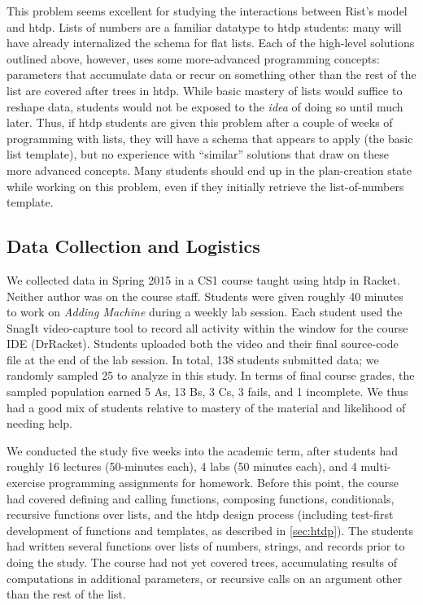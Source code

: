 \documentclass{sig-alternate-05-2015}
\newcommand{\htdp}{{\sc htdp}\xspace}
\def\problemName#1{\emph{#1}\xspace}
\def\Adding{\problemName{Adding Machine}}
\begin{document}
This problem seems excellent for studying the interactions between Rist's model and \htdp.  Lists of numbers are a familiar datatype to \htdp students: many will have already internalized the schema for flat lists.  Each of the high-level solutions outlined above, however, uses some more-advanced programming concepts: parameters that accumulate data or recur on something other than the rest of the list are covered after trees in \htdp. While basic mastery of lists would suffice to reshape data, students would not be exposed to the \emph{idea} of doing so until much later.  Thus, if \htdp students are given this problem after a couple of weeks of programming with lists, they will have a schema that appears to apply (the basic list template), but no experience with ``similar'' solutions that draw on these more advanced concepts.  Many students should end up in the plan-creation state while working on this problem, even if they initially retrieve the list-of-numbers template.

\subsection{Data Collection and Logistics}
\label{sec:logistics}
We collected data in Spring 2015 in a CS1 course taught using \htdp in Racket.  Neither author was on the course staff.  Students were given roughly 40 minutes to work on \Adding during a weekly lab session.  Each student used the SnagIt video-capture tool to record all activity within the window for the course IDE (DrRacket).  Students uploaded both the video and their final source-code file at the end of the lab session.
In total, 138 students submitted data; we randomly sampled 25 to analyze in this study.  In terms of final course grades, the sampled population earned 5 As, 13 Bs, 3 Cs, 3 fails, and 1 incomplete. We thus had a good mix of students relative to mastery of the material and likelihood of needing help.

We conducted the study five weeks into the academic term, after students had roughly 16 lectures (50-minutes each), 4 labs (50 minutes each), and 4 multi-exercise programming assignments for homework.  Before this point, the course had covered defining and calling functions, composing functions, conditionals, recursive functions over lists, and the \htdp design process (including test-first development of functions and templates, as described in \cref{sec:htdp}).  The students had written several functions over lists of numbers, strings, and records prior to doing the study.  The course had not yet covered trees, accumulating results of computations in additional parameters, or recursive calls on an argument other than the rest of the list.
\end{document}
